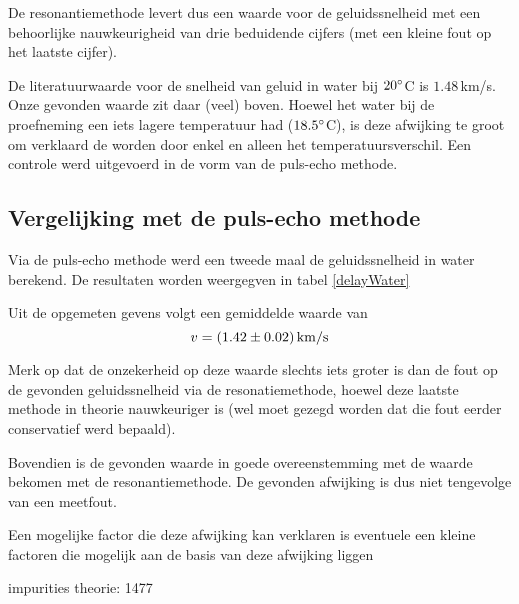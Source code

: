 De resonantiemethode levert dus een waarde voor de geluidssnelheid met een 
behoorlijke nauwkeurigheid van drie beduidende cijfers (met een kleine fout 
op het laatste cijfer).

De literatuurwaarde voor de snelheid van geluid in water bij $20^\circ$C is 
$1.48\,$km/s. Onze gevonden waarde zit daar (veel) boven. Hoewel het water 
bij de proefneming een iets lagere temperatuur had ($18.5^\circ$C), is deze 
afwijking te groot om verklaard de worden door enkel en alleen het 
temperatuursverschil. Een controle werd uitgevoerd in de vorm van de 
puls-echo methode.

\subsection{Vergelijking met de puls-echo methode}
Via de puls-echo methode werd een tweede maal de geluidssnelheid in water 
berekend. De resultaten worden weergegven in tabel \ref{delayWater}

\waterDelay

Uit de opgemeten gevens volgt een gemiddelde waarde van
$$
v = (1.42 \pm 0.02)\,\rm km/s
$$

Merk op dat de onzekerheid op deze waarde slechts iets groter is dan de 
fout op de gevonden geluidssnelheid via de resonatiemethode, hoewel deze 
laatste methode in theorie nauwkeuriger is (wel moet gezegd worden dat die 
fout eerder conservatief werd bepaald).

Bovendien is de gevonden waarde in goede overeenstemming met de waarde 
bekomen met de resonantiemethode. De gevonden afwijking is dus niet 
tengevolge van een meetfout.

Een mogelijke factor die deze afwijking kan verklaren is eventuele een 
kleine  factoren die mogelijk aan de basis van deze afwijking liggen

impurities
theorie: 1477 







